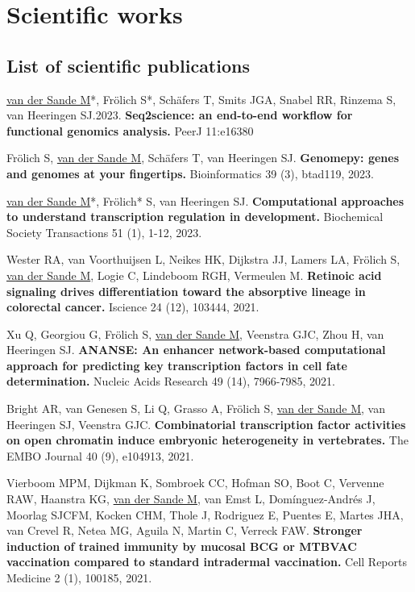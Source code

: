 \section{Scientific works}

\subsection{List of scientific publications}

\noindent
\underline{van der Sande M}*, Frölich S*, Schäfers T, Smits JGA, Snabel RR, Rinzema S, van Heeringen SJ.2023. \textbf{Seq2science: an end-to-end workflow for functional genomics analysis.} PeerJ 11:e16380 \cite{seq2science}
\newline

\noindent
Frölich S, \underline{van der Sande M}, Schäfers T, van Heeringen SJ. \textbf{Genomepy: genes and genomes at your fingertips.} Bioinformatics 39 (3), btad119, 2023. \cite{Frlich2023}
\newline

\noindent
\underline{van der Sande M}*, Frölich* S, van Heeringen SJ. \textbf{Computational approaches to understand transcription regulation in development.} Biochemical Society Transactions 51 (1), 1-12, 2023. \cite{vanderSande2023}
\newline

\noindent
Wester RA, van Voorthuijsen L, Neikes HK, Dijkstra JJ, Lamers LA, Frölich S, \underline{van der Sande M}, Logie C, Lindeboom RGH, Vermeulen M. \textbf{Retinoic acid signaling drives differentiation toward the absorptive lineage in colorectal cancer.} Iscience 24 (12), 103444, 2021. \cite{Wester2021}
\newline

\noindent
Xu Q, Georgiou G, Frölich S, \underline{van der Sande M}, Veenstra GJC, Zhou H, van Heeringen SJ. \textbf{ANANSE: An enhancer network-based computational approach for predicting key transcription factors in cell fate determination.} Nucleic Acids Research 49 (14), 7966-7985, 2021. \cite{Xu_2020}
\newline

\noindent
Bright AR, van Genesen S, Li Q, Grasso A, Frölich S, \underline{van der Sande M}, van Heeringen SJ, Veenstra GJC.
\textbf{Combinatorial transcription factor activities on open chromatin induce embryonic heterogeneity in vertebrates.} The EMBO Journal 40 (9), e104913, 2021. \cite{Bright_2021}
\newline

\noindent
Vierboom MPM, Dijkman K, Sombroek CC, Hofman SO, Boot C, Vervenne RAW, Haanstra KG, \underline{van der Sande M}, van Emst L, Domínguez-Andrés J, Moorlag SJCFM, Kocken CHM, Thole J, Rodriguez E, Puentes E, Martes JHA, van Crevel R, Netea MG, Aguila N, Martin C, Verreck FAW. \textbf{Stronger induction of trained immunity by mucosal BCG or MTBVAC vaccination compared to standard intradermal vaccination.} Cell Reports Medicine 2 (1), 100185, 2021. \cite{Vierboom2021}
\newline

